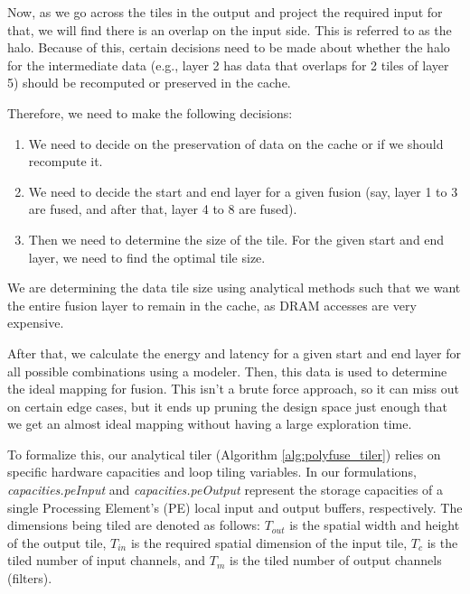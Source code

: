 \documentclass[conference]{IEEEtran}
\begin{document}
Now, as we go across the tiles in the output and project the required input for that, we will find there is an overlap on the input side. This is referred to as the halo. Because of this, certain decisions need to be made about whether the halo for the intermediate data (e.g., layer 2 has data that overlaps for 2 tiles of layer 5) should be recomputed or preserved in the cache.

Therefore, we need to make the following decisions:
\begin{enumerate}
    \item We need to decide on the preservation of data on the cache or if we should recompute it.
    \item We need to decide the start and end layer for a given fusion (say, layer 1 to 3 are fused, and after that, layer 4 to 8 are fused).
    \item Then we need to determine the size of the tile. For the given start and end layer, we need to find the optimal tile size.
\end{enumerate}

We are determining the data tile size using analytical methods such that we want the entire fusion layer to remain in the cache, as DRAM accesses are very expensive.

After that, we calculate the energy and latency for a given start and end layer for all possible combinations using a modeler. Then, this data is used to determine the ideal mapping for fusion. This isn't a brute force approach, so it can miss out on certain edge cases, but it ends up pruning the design space just enough that we get an almost ideal mapping without having a large exploration time.

To formalize this, our analytical tiler (Algorithm \ref{alg:polyfuse_tiler}) relies on specific hardware capacities and loop tiling variables. In our formulations, \textit{capacities.peInput} and \textit{capacities.peOutput} represent the storage capacities of a single Processing Element's (PE) local input and output buffers, respectively. The dimensions being tiled are denoted as follows: $T_{out}$ is the spatial width and height of the output tile, $T_{in}$ is the required spatial dimension of the input tile, $T_c$ is the tiled number of input channels, and $T_m$ is the tiled number of output channels (filters).
\end{document}
